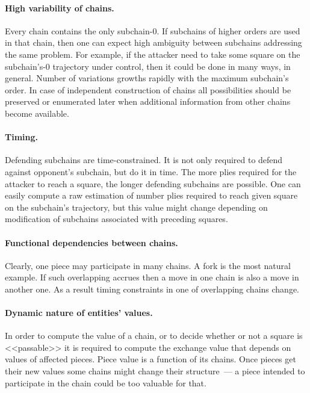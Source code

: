 \documentclass{llncs}
\begin{document}
\paragraph{High variability of chains.} Every chain contains the only
subchain-0. If subchains of higher orders are used in that chain, then
one can expect high ambiguity between subchains addressing the same
problem. For example, if the attacker need to take some square on the
subchain's-0 trajectory under control, then it could be done in many
ways, in general. Number of variations growths rapidly with the
maximum subchain's order. In case of independent construction of
chains all possibilities should be preserved or enumerated later when
additional information from other chains become available.

\paragraph{Timing.} Defending subchains are time-constrained. It is
not only required to defend against opponent's subchain, but do it in
time. The more plies required for the attacker to reach a square, the
longer defending subchains are possible. One can easily compute a raw
estimation of number plies required to reach given square on the
subchain's trajectory, but this value might change depending on
modification of subchains associated with preceding squares.

\paragraph{Functional dependencies between chains.} Clearly, one piece
may participate in many chains. A fork is the most natural example. If
such overlapping accrues then a move in one chain is also a move in
another one. As a result timing constraints in one of overlapping
chains change.

\paragraph{Dynamic nature of entities' values.} In order to compute the value of a chain,
or to decide whether or not a square is <<passable>> it is required to
compute the exchange value that depends on values of affected
pieces. Piece value is a function of its chains. Once pieces get their
new values some chains might change their structure~--- a piece
intended to participate in the chain could be too valuable for that.

\end{document}
